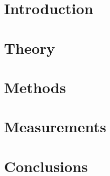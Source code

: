 \documentclass{thesis}
\begin{document}
\maketitle











\thesisTables
\thesisBodyStart


\let\oldequation=\equation
\let\endoldequation=\endequation
\renewenvironment{equation}{\vspace{7mm}\begin{oldequation}}{\end{oldequation}}

\captionsetup[figure]{font=small,labelfont=small}

\chapter{Introduction}


\chapter{Theory}


\chapter{Methods}


\chapter{Measurements}


\chapter{Conclusions}


\printbibliography
\end{document}
